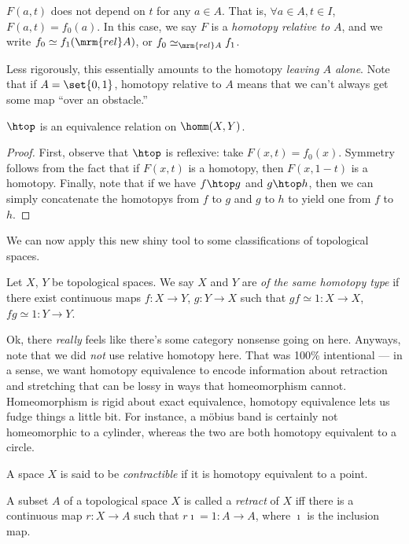 \documentclass{fkbook}
\theoremstyle{snazzydefinition}
\begin{document}
\begin{adjustwidth}{1em}{1em}
\begin{definition}
    $F(a,t)$ does not depend on $t$ for any $a \in A$. That is,
    $\forall a \in A, t \in I$, $F(a,t) = f_0(a)$. In this case, we
    say $F$ is a \emph{homotopy relative to $A$}, and we write $f_0
    \simeq f_1 (\mrm{rel} A)$, or $f_0 \simeq_{\mrm{rel} A} f_1$.
  \end{definition}
  Less rigorously, this essentially amounts to the homotopy
  \emph{leaving $A$ alone}. Note that if $A = \set{0,1}$, homotopy
  relative to $A$ means that we can't always get some map ``over an
  obstacle.''
  \begin{lemma}
    $\htop$ is an equivalence relation on $\homm(X,Y)$.
  \end{lemma}
  \begin{proof}
    First, observe that $\htop$ is reflexive: take $F(x,t) = f_0(x)$.
    Symmetry follows from the fact that if $F(x,t)$ is a homotopy,
    then $F(x, 1-t)$ is a homotopy. Finally, note that if we have $f
    \htop g$ and $g \htop h$, then we can simply concatenate the
    homotopys from $f$ to $g$ and $g$ to $h$ to yield one from $f$ to
    $h$.
  \end{proof}
  We can now apply this new shiny tool to some classifications of
  topological spaces.
  \begin{definition}
    Let $X$, $Y$ be topological spaces. We say $X$ and $Y$ are
    \emph{of the same homotopy type} if there exist continuous maps $f
    : X \to Y$, $g : Y \to X$ such that $gf \simeq 1 : X \to X$, $fg
    \simeq 1 : Y \to Y$.
  \end{definition}
  Ok, there \emph{really} feels like there's some category nonsense
  going on here. Anyways, note that we did \emph{not} use relative
  homotopy here. That was 100\% intentional --- in a sense, we want
  homotopy equivalence to encode information about retraction and
  stretching that can be lossy in ways that homeomorphism cannot.
  Homeomorphism is rigid about exact equivalence, homotopy equivalence
  lets us fudge things a little bit. For instance, a m\"{o}bius band
  is certainly not homeomorphic to a cylinder, whereas the two are
  both homotopy equivalent to a circle.
  \begin{definition}
    A space $X$ is said to be \emph{contractible} if it is homotopy
    equivalent to a point.
  \end{definition}
  \begin{definition}
    A subset $A$ of a topological space $X$ is called a \emph{retract}
    of $X$ iff there is a continuous map $r : X \to A$ such that
    $r\imath = 1 : A \to A$, where $\imath$ is the inclusion map.

\end{definition}
\end{adjustwidth}
\end{document}
